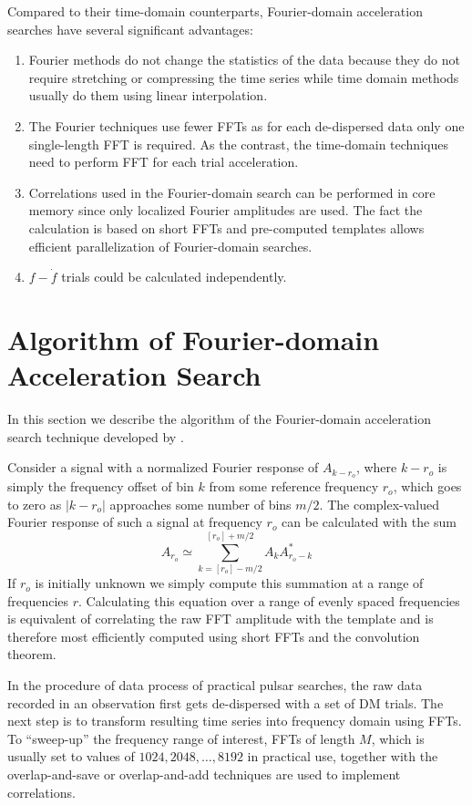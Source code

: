 \documentclass[preprint2]{aastex}
\begin{document}
Compared to their time-domain counterparts, Fourier-domain acceleration searches 
have several significant advantages:
\begin{enumerate}
  \item Fourier methods do not change the statistics of the data because they do 
not require stretching or compressing the time series while time domain methods usually
 do them using linear interpolation.
  \item The Fourier techniques use fewer FFTs as for each de-dispersed data only
one single-length FFT is required. As the contrast, the time-domain techniques 
need to perform FFT for each trial acceleration.
  \item Correlations used in the Fourier-domain search can be performed in core 
memory since only localized Fourier amplitudes are used. The fact the calculation 
is based on short FFTs and pre-computed templates allows 
efficient parallelization of Fourier-domain searches.
  \item $f-\dot{f}$ trials could be calculated independently.
\end{enumerate}


\section{Algorithm of Fourier-domain Acceleration Search}
In this section we describe the algorithm of the Fourier-domain acceleration search 
technique developed by \citet{ran02}.

Consider a signal with a normalized Fourier response of 
$A_{k-r_o}$, where $k-r_o$ is simply the frequency offset of bin $k$ from some 
reference frequency $r_o$, which goes to zero as $|k-r_o|$ approaches some 
number of bins $m/2$. The complex-valued Fourier response of such a signal at 
frequency $r_o$ can be calculated with the sum
\begin{equation}
A_{r_o}\simeq \sum_{k=[{r_o}]-m/2}^{[{r_o}]+m/2}A_k A_{r_o-k}^*
\end{equation}
If $r_o$ is initially unknown we simply compute this summation at a range of 
frequencies $r$. Calculating this equation over a range of evenly spaced 
frequencies is equivalent of correlating the raw FFT amplitude with the template 
and is therefore most efficiently computed using short FFTs and the convolution 
theorem. 

In the procedure of data process of practical pulsar searches, the raw data recorded in an observation first 
gets de-dispersed with a set of DM trials. The next step is to transform 
resulting time series into frequency domain using FFTs. To ``sweep-up'' the 
frequency range of interest, FFTs of length $M$, which is usually set to values of $1024, 
2048, \ldots, 8192$ in practical use, together with the overlap-and-save or 
overlap-and-add techniques are used to implement  correlations. 
\end{document}
